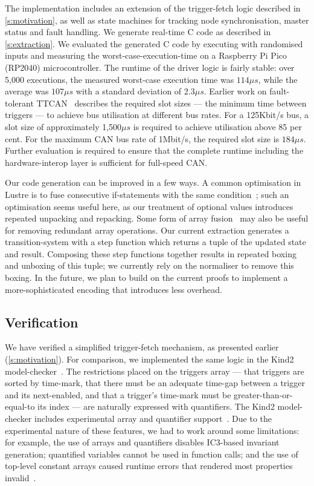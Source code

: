 \documentclass[a4paper,UKenglish,cleveref, autoref, thm-restate,anonymous]{lipics-v2021}
\begin{document}
The implementation includes an extension of the trigger-fetch logic described in \autoref{s:motivation}, as well as state machines for tracking node synchronisation, master status and fault handling.
We generate real-time C code as described in \autoref{s:extraction}.
We evaluated the generated C code by executing with randomised inputs and measuring the worst-case-execution-time on a Raspberry Pi Pico (RP2040) microcontroller.
The runtime of the driver logic is fairly stable: over 5,000 executions, the measured worst-case execution time was $114\mu{}s$, while the average was $107\mu{}s$ with a standard deviation of $2.3\mu{}s$.
Earlier work on fault-tolerant TTCAN~\cite{short2007fault} describes the required slot sizes --- the minimum time between triggers --- to achieve bus utilisation at different bus rates.
For a 125Kbit/s bus, a slot size of approximately 1,500$\mu{}s$ is required to achieve utilisation above 85 per cent.
For the maximum CAN bus rate of 1Mbit/s, the required slot size is $184\mu{}s$.
Further evaluation is required to ensure that the complete runtime including the hardware-interop layer is sufficient for full-speed CAN.

Our code generation can be improved in a few ways.
A common optimisation in Lustre is to fuse consecutive if-statements with the same condition~\cite{bourke2017formally}; such an optimisation seems useful here, as our treatment of optional values introduces repeated unpacking and repacking.
Some form of array fusion~\cite{robinson2017machine} may also be useful for removing redundant array operations.
Our current extraction generates a transition-system with a step function which returns a tuple of the updated state and result.
Composing these step functions together results in repeated boxing and unboxing of this tuple; we currently rely on the \fstar{} normaliser to remove this boxing.
In the future, we plan to build on the current proofs to implement a more-sophisticated encoding that introduces less overhead.

\subsection{Verification}

We have verified a simplified trigger-fetch mechanism, as presented earlier (\autoref{s:motivation}).
For comparison, we implemented the same logic in the Kind2 model-checker~\cite{champion2016kind2}.
The restrictions placed on the triggers array --- that triggers are sorted by time-mark, that there must be an adequate time-gap between a trigger and its next-enabled, and that a trigger's time-mark must be greater-than-or-equal-to its index --- are naturally expressed with quantifiers.
The Kind2 model-checker includes experimental array and quantifier support~\cite{kind2userdoc}.
Due to the experimental nature of these features, we had to work around some limitations: for example, the use of arrays and quantifiers disables IC3-based invariant generation; quantified variables cannot be used in function calls; and the use of top-level constant arrays caused runtime errors that rendered most properties invalid~\cite{kind2024toparray}.
\end{document}
